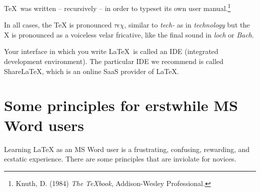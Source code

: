 \documentclass[a4paper,11pt]{scrartcl}\usepackage[]{graphicx}\usepackage[]{color}
\let\oldsection\section
\renewcommand\section{\clearpage\oldsection}
\begin{document}
\TeX\ was written -- recursively -- in order to typeset its own user manual.\footnote{Knuth, D. (1984) \textit{The \TeX book}, Addison-Wesley Professional.} 

In all cases, the \TeX{} is pronounced \(\tau\epsilon\chi\), similar to \emph{tech-} as in \emph{technology} but the X is pronounced as a voiceless velar fricative, like the final sound in \emph{loch} or \emph{Bach}. 

Your interface in which you write \LaTeX\ is called an IDE (integrated development environment). The particular IDE we recommend is called ShareLaTeX, which is an online SaaS provider of \LaTeX. 

\newpage

 \section{Some principles for erstwhile MS Word users}
 Learning \LaTeX{} as an MS Word user is a frustrating, confusing, rewarding, and ecstatic experience.  There are some principles that are inviolate for novices.
\end{document}
